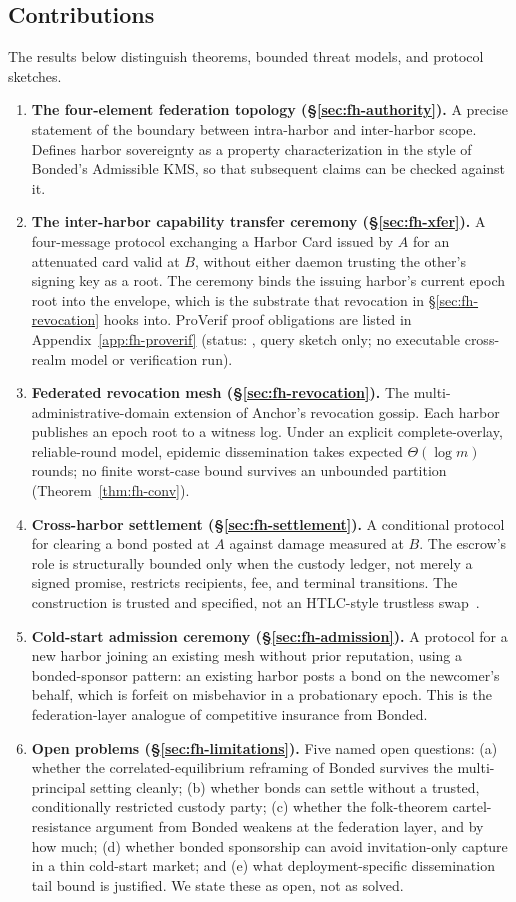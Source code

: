 \documentclass[11pt,a4paper]{article}
\theoremstyle{definition}
\theoremstyle{remark}
\begin{document}
\subsection{Contributions}\label{sec:fh-contributions}
The results below distinguish theorems, bounded threat models, and protocol sketches.
\begin{enumerate}
\item \textbf{The four-element federation topology (\S\ref{sec:fh-authority}).} A precise statement of the boundary between intra-harbor and inter-harbor scope. Defines harbor sovereignty as a property characterization in the style of Bonded's Admissible KMS, so that subsequent claims can be checked against it.
\item \textbf{The inter-harbor capability transfer ceremony (\S\ref{sec:fh-xfer}).} A four-message protocol exchanging a Harbor Card issued by $A$ for an attenuated card valid at $B$, without either daemon trusting the other's signing key as a root. The ceremony binds the issuing harbor's current epoch root into the envelope, which is the substrate that revocation in \S\ref{sec:fh-revocation} hooks into. ProVerif proof obligations are listed in Appendix~\ref{app:fh-proverif} (status: \Partial, query sketch only; no executable cross-realm model or verification run).
\item \textbf{Federated revocation mesh (\S\ref{sec:fh-revocation}).} The multi-administrative-domain extension of Anchor's revocation gossip. Each harbor publishes an epoch root to a witness log. Under an explicit complete-overlay, reliable-round model, epidemic dissemination takes expected $\Theta(\log m)$ rounds; no finite worst-case bound survives an unbounded partition (Theorem~\ref{thm:fh-conv}).
\item \textbf{Cross-harbor settlement (\S\ref{sec:fh-settlement}).} A conditional protocol for clearing a bond posted at $A$ against damage measured at $B$. The escrow's role is structurally bounded only when the custody ledger, not merely a signed promise, restricts recipients, fee, and terminal transitions. The construction is trusted and specified, not an HTLC-style trustless swap~.
\item \textbf{Cold-start admission ceremony (\S\ref{sec:fh-admission}).} A protocol for a new harbor joining an existing mesh without prior reputation, using a bonded-sponsor pattern: an existing harbor posts a bond on the newcomer's behalf, which is forfeit on misbehavior in a probationary epoch. This is the federation-layer analogue of competitive insurance from Bonded.
\item \textbf{Open problems (\S\ref{sec:fh-limitations}).} Five named open questions: (a) whether the correlated-equilibrium reframing of Bonded survives the multi-principal setting cleanly; (b) whether bonds can settle without a trusted, conditionally restricted custody party; (c) whether the folk-theorem cartel-resistance argument from Bonded weakens at the federation layer, and by how much; (d) whether bonded sponsorship can avoid invitation-only capture in a thin cold-start market; and (e) what deployment-specific dissemination tail bound is justified. We state these as open, not as solved.
\end{enumerate}
\end{document}
